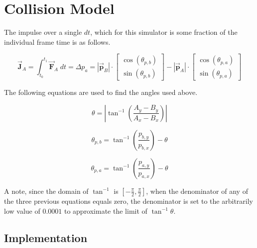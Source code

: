 \documentclass[12pt]{article}
\begin{document}
\section{Collision Model}
    \begin{flushleft}
        The impulse over a single $dt$, which for this simulator is some fraction of the individual frame time is as follows. 
    \end{flushleft}
    \[ 
        \vec{\mathbf{J}}_A=
        \int_{t_{0}}^{t_{1}} \vec{\mathbf{F}}_{A}\;dt=
        \Delta p_{a}=\left| \vec{\mathbf{p}}_{B} \right|\cdot 
        \begin{bmatrix} 
            \cos\left( \theta_{p,b} \right) \\ 
            \sin\left( \theta_{p,b} \right) 
        \end{bmatrix} 
        - \left| \vec{\mathbf{p}}_{A} \right|\cdot 
        \begin{bmatrix} 
            \cos\left( \theta_{p,a} \right) \\ 
            \sin\left( \theta_{p,a} \right) 
        \end{bmatrix} 
    \]
    \begin{flushleft}
        The following equations are used to find the angles used above.
    \end{flushleft}
    \[ 
        \theta=\left| \tan^{-1}\left( \frac{A_{y}-B_{y}}{A_{x}-B_{x}} \right) \right|
    \]

    \[
        \theta_{p,b}=\tan^{-1}\left( \frac{p_{b,y}}{p_{b,x}} \right) - \theta
    \]

    \[
        \theta_{p,a}=\tan^{-1}\left( \frac{p_{a,y}}{p_{a,x}} \right) - \theta  
    \]

    \begin{flushleft}
        A note, since the domain of $\tan^{-1}$ is $\left[ -\frac{\pi}{2}, \frac{\pi}{2} \right]$, when the denominator of any of the three previous equations equals zero, the denominator is set to the arbitrarily low value of $0.0001$ to approximate the limit of $\tan^{-1}\theta$.
    \end{flushleft}

\subsection{Implementation} 

\end{document}
